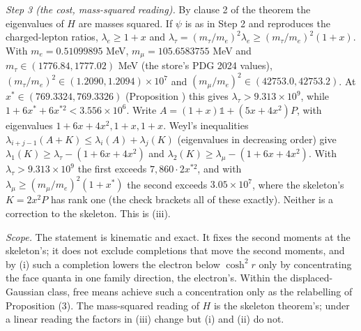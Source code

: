 \emph{Step 3 (the cost, mass-squared reading).} By clause 2 of the theorem the eigenvalues of $H$ are masses squared. If $\psi$ is as in Step 2 and reproduces the charged-lepton ratios, $\lambda_{e} \ge 1 + x$ and $\lambda_{\tau} = (m_{\tau}/m_{e})^{2}\lambda_{e} \ge (m_{\tau}/m_{e})^{2}(1 + x)$. With $m_{e} = 0.51099895$ MeV, $m_{\mu} = 105.6583755$ MeV and $m_{\tau} \in (1776.84, 1777.02)$ MeV (the store's PDG 2024 values), $(m_{\tau}/m_{e})^{2} \in (1.2090, 1.2094) \times 10^{7}$ and $(m_{\mu}/m_{e})^{2} \in (42753.0, 42753.2)$. At $x^{*} \in (769.3324, 769.3326)$ (Proposition ) this gives $\lambda_{\tau} > 9.313 \times 10^{9}$, while $1 + 6x^{*} + 6x^{*2} < 3.556 \times 10^{6}$. Write $A = (1 + x)\mathbb{1} + (5x + 4x^{2})P$, with eigenvalues $1 + 6x + 4x^{2}, 1 + x, 1 + x$. Weyl's inequalities $\lambda_{i + j - 1}(A + K) \le \lambda_{i}(A) + \lambda_{j}(K)$ (eigenvalues in decreasing order) give $\lambda_{1}(K) \ge \lambda_{\tau} - (1 + 6x + 4x^{2})$ and $\lambda_{2}(K) \ge \lambda_{\mu} - (1 + 6x + 4x^{2})$. With $\lambda_{\tau} > 9.313 \times 10^{9}$ the first exceeds $7{,}860 \cdot 2x^{*2}$, and with $\lambda_{\mu} \ge (m_{\mu}/m_{e})^{2}(1 + x^{*})$ the second exceeds $3.05 \times 10^{7}$, where the skeleton's $K = 2x^{2}P$ has rank one (the check brackets all of these exactly). Neither is a correction to the skeleton. This is (iii).

\emph{Scope.} The statement is kinematic and exact. It fixes the second moments at the skeleton's; it does not exclude completions that move the second moments, and by (i) such a completion lowers the electron below $\cosh^{2}r$ only by concentrating the face quanta in one family direction, the electron's. Within the displaced-Gaussian class, free means achieve such a concentration only as the relabelling of Proposition (3). The mass-squared reading of $H$ is the skeleton theorem's; under a linear reading the factors in (iii) change but (i) and (ii) do not.
